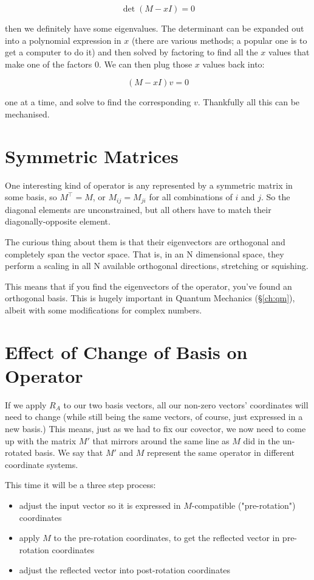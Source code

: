 $$\det{(M - xI)} = 0$$

then we definitely have some eigenvalues. The determinant can be expanded out into a polynomial expression in $x$ (there are various methods; a popular one is to get a computer to do it) and then solved by factoring to find all the $x$ values that make one of the factors $0$. We can then plug those $x$ values back into:

$$(M - xI)v = 0$$

one at a time, and solve to find the corresponding $v$. Thankfully all this can be mechanised.

\section{Symmetric Matrices}\label{ch:vectors-symmetric}

One interesting kind of operator is any represented by a symmetric matrix in some basis, so $M^\intercal = M$, or $M_{ij} = M_{ji}$ for all combinations of $i$ and $j$. So the diagonal elements are unconstrained, but all others have to match their diagonally-opposite element.

The curious thing about them is that their eigenvectors are orthogonal and completely span the vector space. That is, in an N dimensional space, they perform a scaling in all N available orthogonal directions, stretching or squishing.

This means that if you find the eigenvectors of the operator, you've found an orthogonal basis. This is hugely important in Quantum Mechanics (§\ref{ch:qm}), albeit with some modifications for complex numbers.

\section{Effect of Change of Basis on Operator}

If we apply $R_A$ to our two basis vectors, all our non-zero vectors' coordinates will need to change (while still being the same vectors, of course, just expressed in a new basis.) This means, just as we had to fix our covector, we now need to come up with the matrix $M'$ that mirrors around the same line as $M$ did in the un-rotated basis. We say that $M'$ and $M$ represent the same operator in different coordinate systems.

This time it will be a three step process:

\begin{itemize}
    \item adjust the input vector so it is expressed in $M$-compatible ("pre-rotation") coordinates
    \item apply $M$ to the pre-rotation coordinates, to get the reflected vector in pre-rotation coordinates
    \item adjust the reflected vector into post-rotation coordinates
\end{itemize}

